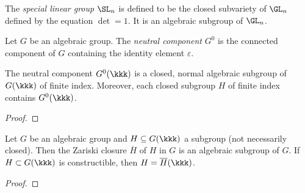 
    \begin{example}\label{eg:special_linear_group}
        The \emph{special linear group} $\SL_n$ is defined to be the closed subvariety of $\GL_n$ defined by the equation \(\det = 1\).
        It is an algebraic subgroup of \(\GL_n\).
    \end{example}

    \begin{definition}\label{def:neutral_component}
        Let \(G\) be an algebraic group.
        The \emph{neutral component} \(G^0\) is the connected component of \(G\) containing the identity element \(\varepsilon\).
    \end{definition}

    \begin{proposition}\label{prop:neutral_component_is_subgroup}
        The neutral component \(G^0(\kkk)\) is a closed, normal algebraic subgroup of \(G(\kkk)\) of finite index.
        Moreover, each closed subgroup \(H\) of finite index contains \(G^0(\kkk)\).
    \end{proposition}
    \begin{proof}
    \end{proof}

    \begin{proposition}\label{prop:closure_of_subgroup_is_subgroup}
        Let \(G\) be an algebraic group and \(H \subseteq G(\kkk)\) a subgroup (not necessarily closed).
        Then the Zariski closure \(\overline{H}\) of \(H\) in \(G\) is an algebraic subgroup of \(G\).
        If \(H \subset G(\kkk)\) is constructible, then \(H = \overline{H}(\kkk)\).
    \end{proposition}
    \begin{proof}
    \end{proof}


